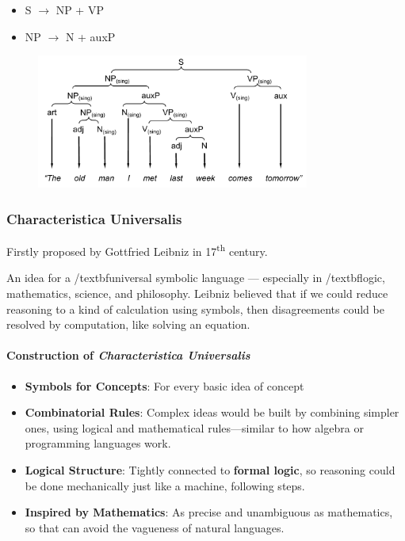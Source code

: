 \documentclass[a4paper, openany]{book}
\begin{document}
\begin{itemize}
  \item S $\rightarrow$ NP + VP
  \item NP $\rightarrow$ N + auxP
\end{itemize}

\begin{figure}[htbp]
  \centering
  \includegraphics[width=0.8\textwidth]{assets/GrammarAsRecursiveRules1.png}
\end{figure}

\subsubsection{Characteristica Universalis}

Firstly proposed by Gottfried Leibniz in 17\textsuperscript{th} century.

An idea for a /textbf{universal symbolic language} --- especially in /textbf{logic, mathematics, science, and philosophy}. Leibniz believed that if we could reduce reasoning to a kind of calculation using symbols, then disagreements could be resolved by computation, like solving an equation.

\paragraph{Construction of \textit{Characteristica Universalis}}

\begin{itemize}
  \item \textbf{Symbols for Concepts}: For every basic idea of concept
  \item \textbf{Combinatorial Rules}: Complex ideas would be built by combining simpler ones, using logical and mathematical rules—similar to how algebra or programming languages work.
  \item \textbf{Logical Structure}: Tightly connected to \textbf{formal logic}, so reasoning could be done mechanically just like a machine, following steps.
  \item \textbf{Inspired by Mathematics}: As precise and unambiguous as mathematics, so that can avoid the vagueness of natural languages.
\end{itemize}
\end{document}
